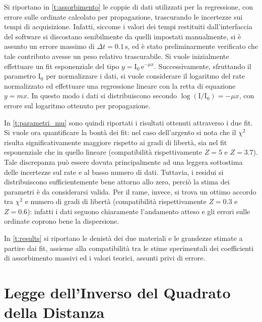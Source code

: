 \documentclass[twocolumn,10pt]{asme2ej}
\begin{document}
Si riportano in \autoref{t:assorbimento} le coppie di dati utilizzati per la regressione, con errore sulle ordinate
calcolato per propagazione, trascurando le incertezze sui tempi di acquisizione. Infatti, siccome i valori dei tempi
restituiti dall'interfaccia del software si discostano senibilmente da quelli impostati manualmente, si è assunto un
errore massimo di $\Delta t = 0.1\,\si{\second}$, ed è stato preliminarmente verificato che tale contributo avesse un
peso relativo trascurabile. Si vuole inizialmente effettuare un fit esponenziale del tipo $y =
\text{I}_0\,\text{e}^{-\mu x}$. Successivamente, sfruttando il parametro $\text{I}_0$ per normalizzare i dati, si vuole
considerare il logaritmo del rate normalizzato ed effettuare una regressione lineare con la retta di equazione $y = mx$.
In questo modo i dati si distribuiscono secondo $\log(\text{I}/\text{I}_0)=-\mu x$, con errore sul logaritmo ottenuto
per propagazione.

In \autoref{t:parametri_mu} sono quindi riportati i risultati ottenuti attraverso i due fit. Si vuole ora quantificare
la bontà dei fit: nel caso dell'argento si nota che il $\chi^2$ risulta significativamente maggiore rispetto ai gradi di
libertà, sia nel fit esponenziale che in quello lineare (compatibilità rispettivamente $Z=5$ e $Z=3.7$). Tale
discrepanza può essere dovuta principalmente ad una leggera sottostima delle incertezze sul rate e al basso numero di
dati. Tuttavia, i residui si distribuiscono sufficientemente bene attorno allo zero, perciò la stima dei parametri è da
considerarsi valida. Per il rame, invece, si trova un ottimo accordo tra $\chi^2$ e numero di gradi di libertà
(compatibilità rispettivamente $Z=0.3$ e $Z=0.6$): infatti i dati seguono chiaramente l'andamento atteso e gli errori
sulle ordinate coprono bene la dispersione. 

In \autoref{t:results} si riportano le denistà dei due materiali e le grandezze stimate a partire dai fit, assieme alla
compatibilità tra le stime sperimentali dei coefficienti di assorbimento massivi ed i valori teorici, assunti privi di
errore. 



\vspace{-10pt}
\section{Legge dell'Inverso del Quadrato della Distanza}\label{s:distanza}
\end{document}
